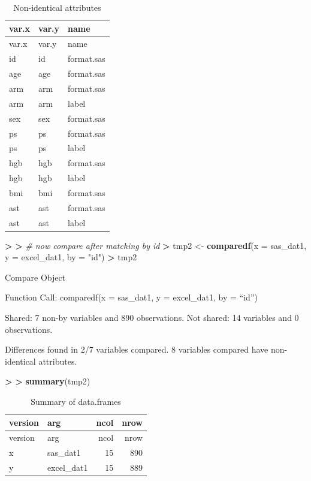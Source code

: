 \documentclass[
]{book}
\newenvironment{Shaded}{\begin{snugshade}}{\end{snugshade}}
\newcommand{\CommentTok}[1]{\textcolor[rgb]{0.56,0.35,0.01}{\textit{#1}}}
\newcommand{\DataTypeTok}[1]{\textcolor[rgb]{0.13,0.29,0.53}{#1}}
\newcommand{\ErrorTok}[1]{\textcolor[rgb]{0.64,0.00,0.00}{\textbf{#1}}}
\newcommand{\KeywordTok}[1]{\textcolor[rgb]{0.13,0.29,0.53}{\textbf{#1}}}
\newcommand{\NormalTok}[1]{#1}
\newcommand{\OperatorTok}[1]{\textcolor[rgb]{0.81,0.36,0.00}{\textbf{#1}}}
\newcommand{\StringTok}[1]{\textcolor[rgb]{0.31,0.60,0.02}{#1}}
\begin{document}
\begin{longtable}[]{@{}lll@{}}
\caption{\label{tab:unnamed-chunk-28}Non-identical attributes}\tabularnewline
\toprule
var.x & var.y & name\tabularnewline
\midrule
\endfirsthead
\toprule
var.x & var.y & name\tabularnewline
\midrule
\endhead
id & id & format.sas\tabularnewline
age & age & format.sas\tabularnewline
arm & arm & format.sas\tabularnewline
arm & arm & label\tabularnewline
sex & sex & format.sas\tabularnewline
ps & ps & format.sas\tabularnewline
ps & ps & label\tabularnewline
hgb & hgb & format.sas\tabularnewline
hgb & hgb & label\tabularnewline
bmi & bmi & format.sas\tabularnewline
ast & ast & format.sas\tabularnewline
ast & ast & label\tabularnewline
\bottomrule
\end{longtable}

\begin{Shaded}
\begin{Highlighting}[]
\OperatorTok{>}\StringTok{ }
\ErrorTok{>}\StringTok{ }\CommentTok{# now compare after matching by id}
\ErrorTok{>}\StringTok{ }\NormalTok{tmp2 <-}\StringTok{ }\KeywordTok{comparedf}\NormalTok{(}\DataTypeTok{x =}\NormalTok{ sas_dat1, }\DataTypeTok{y =}\NormalTok{ excel_dat1, }\DataTypeTok{by =} \StringTok{"id"}\NormalTok{)}
\OperatorTok{>}\StringTok{ }\NormalTok{tmp2}
\end{Highlighting}
\end{Shaded}

Compare Object

Function Call:
comparedf(x = sas\_dat1, y = excel\_dat1, by = ``id'')

Shared: 7 non-by variables and 890 observations.
Not shared: 14 variables and 0 observations.

Differences found in 2/7 variables compared.
8 variables compared have non-identical attributes.

\begin{Shaded}
\begin{Highlighting}[]
\OperatorTok{>}\StringTok{ }
\ErrorTok{>}\StringTok{ }\KeywordTok{summary}\NormalTok{(tmp2)}
\end{Highlighting}
\end{Shaded}

\begin{longtable}[]{@{}llrr@{}}
\caption{\label{tab:unnamed-chunk-28}Summary of data.frames}\tabularnewline
\toprule
version & arg & ncol & nrow\tabularnewline
\midrule
\endfirsthead
\toprule
version & arg & ncol & nrow\tabularnewline
\midrule
\endhead
x & sas\_dat1 & 15 & 890\tabularnewline
y & excel\_dat1 & 15 & 889\tabularnewline
\bottomrule
\end{longtable}
\end{document}
